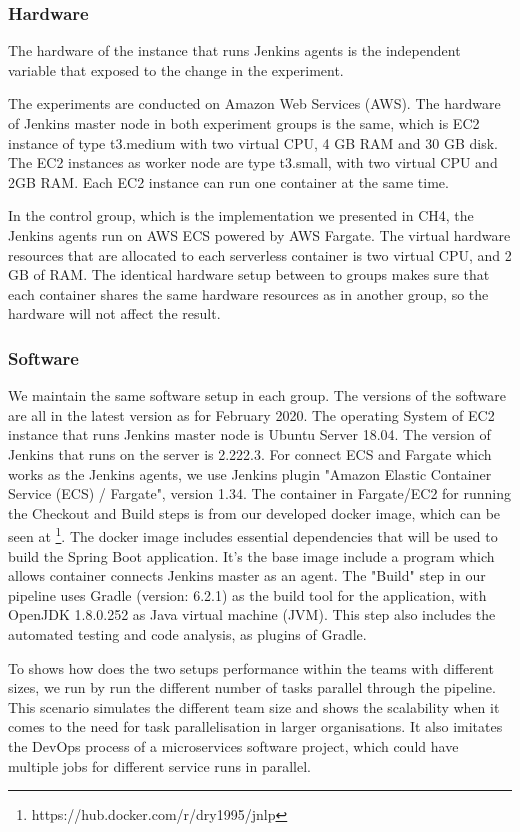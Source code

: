 \subsubsection{Hardware}
The hardware of the instance that runs Jenkins agents is the independent variable that exposed to the change in the experiment.
\par
The experiments are conducted on Amazon Web Services (AWS). The hardware of Jenkins master node in both experiment groups is the same, which is EC2 instance of type t3.medium with two virtual CPU, 4 GB RAM and 30 GB disk. The EC2 instances as worker node are type t3.small, with two virtual CPU and 2GB RAM. Each EC2 instance can run one container at the same time.
\par
In the control group, which is the implementation we presented in CH4, the Jenkins agents run on AWS ECS powered by AWS Fargate. The virtual hardware resources that are allocated to each serverless container is two virtual CPU, and 2 GB of RAM. The identical hardware setup between to groups makes sure that each container shares the same hardware resources as in another group, so the hardware will not affect the result.
\subsubsection{Software}
We maintain the same software setup in each group. The versions of the software are all in the latest version as for February 2020. The operating System of EC2 instance that runs Jenkins master node is Ubuntu Server 18.04. The version of Jenkins that runs on the server is 2.222.3. For connect ECS and Fargate which works as the Jenkins agents, we use Jenkins plugin "Amazon Elastic Container Service (ECS) / Fargate", version 1.34. The container in Fargate/EC2 for running the Checkout and Build steps is from our developed docker image, which can be seen at \footnote{https://hub.docker.com/r/dry1995/jnlp}. The docker image includes essential dependencies that will be used to build the Spring Boot application. It's the base image include a program which allows container connects Jenkins master as an agent. The "Build" step in our pipeline uses Gradle (version: 6.2.1) as the build tool for the application,
with OpenJDK 1.8.0.252 as Java virtual machine (JVM).
This step also includes the automated testing and code analysis, as plugins of Gradle. 
\par
To shows how does the two setups performance within the teams with different sizes, we run by run the different number of tasks parallel through the pipeline. This scenario simulates the different team size and shows the scalability when it comes to the need for task parallelisation in larger organisations. It also imitates the DevOps process of a microservices software project, which could have multiple jobs for different service runs in parallel.
